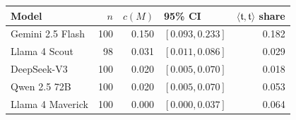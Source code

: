 \begin{tabular}{@{}l@{\qquad}r@{\quad}r@{\quad}l@{\qquad}r@{}}
\toprule
Model & $n$ & $c(M)$ & 95\% CI & $\langle\mathfrak{t},\mathfrak{t}\rangle$ share \\
\midrule
Gemini 2.5 Flash & 100 & 0.150 & $[0.093, 0.233]$ & 0.182 \\
Llama 4 Scout & 98 & 0.031 & $[0.011, 0.086]$ & 0.029 \\
DeepSeek-V3 & 100 & 0.020 & $[0.005, 0.070]$ & 0.018 \\
Qwen 2.5 72B & 100 & 0.020 & $[0.005, 0.070]$ & 0.053 \\
Llama 4 Maverick & 100 & 0.000 & $[0.000, 0.037]$ & 0.064 \\
\bottomrule
\end{tabular}
